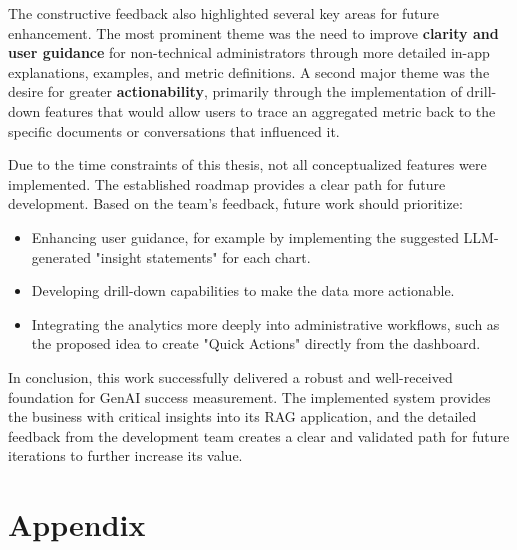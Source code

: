 \documentclass[
	english,
	ruledheaders=section,%
	class=report,%
	thesis={type=bachelor},%
	accentcolor=1b,%
	custommargins=true,%
	marginpar=false,%
	parskip=half-,%
	fontsize=11pt,%
	DIV=14,
]{tudapub}
\begin{document}
The constructive feedback also highlighted several key areas for future enhancement. The most prominent theme was the need to improve \textbf{clarity and user guidance} for non-technical administrators through more detailed in-app explanations, examples, and metric definitions. A second major theme was the desire for greater \textbf{actionability}, primarily through the implementation of drill-down features that would allow users to trace an aggregated metric back to the specific documents or conversations that influenced it.

Due to the time constraints of this thesis, not all conceptualized features were implemented. The established roadmap provides a clear path for future development. Based on the team's feedback, future work should prioritize:
\begin{itemize}
    \item Enhancing user guidance, for example by implementing the suggested LLM-generated "insight statements" for each chart.
    \item Developing drill-down capabilities to make the data more actionable.
    \item Integrating the analytics more deeply into administrative workflows, such as the proposed idea to create "Quick Actions" directly from the dashboard.
\end{itemize}

In conclusion, this work successfully delivered a robust and well-received foundation for GenAI success measurement. The implemented system provides the business with critical insights into its RAG application, and the detailed feedback from the development team creates a clear and validated path for future iterations to further increase its value.
\chapter*{Appendix}
\setcounter{page}{\value{seitenzahlroemisch}}




\printbibliography



\end{document}
